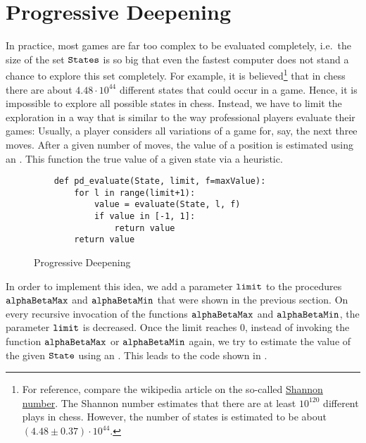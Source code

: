\section{Progressive Deepening}
In practice, most games are far too complex to be evaluated completely, i.e.~the size of the set
$\texttt{States}$ is so big that even the fastest computer does not stand a chance to explore this set
completely.  For example, it is believed\footnote{
  For reference, compare the wikipedia article on the so-called
  \href{https://en.wikipedia.org/wiki/Shannon_number}{Shannon number}.
  The Shannon number estimates that there are at least $10^{120}$ different plays in chess.  However, the
  number of states is estimated to be about $(4.48\pm 0.37) \cdot 10^{44}$. 
}
that in chess there are about $4.48 \cdot 10^{44}$ different states that could occur in a game.
Hence, it is impossible to explore all possible states in chess.  Instead, we have to limit
the exploration in a way that is similar to the way professional players evaluate their games:  Usually, a
player considers all variations of a game for, say, the next three moves.  After a given number of moves, the
value of a position is estimated using an .  This function  the true
value of a given state via a heuristic.

\begin{figure}[!ht]
\centering
\begin{verbatim}
    def pd_evaluate(State, limit, f=maxValue):
        for l in range(limit+1):
            value = evaluate(State, l, f)
            if value in [-1, 1]:
                return value
        return value
\end{verbatim}
\caption{Progressive Deepening}
\label{fig:Game.ipynb:pd_evaluate}
\end{figure}
\FloatBarrier


In order to implement this idea, we add a parameter $\texttt{limit}$ to the procedures $\texttt{alphaBetaMax}$
and $\texttt{alphaBetaMin}$ that were shown in the previous section.  On
every recursive invocation of the functions $\texttt{alphaBetaMax}$ and $\texttt{alphaBetaMin}$, the parameter
$\texttt{limit}$ is decreased. 
Once the limit reaches $0$, instead of invoking the function $\texttt{alphaBetaMax}$ or $\texttt{alphaBetaMin}$
again, we try to estimate the value of the given $\texttt{State}$ using an .  This
leads to the code shown in . 

